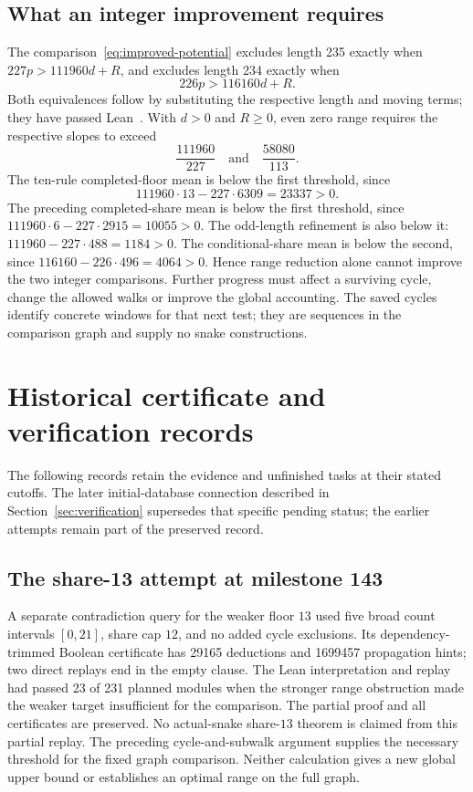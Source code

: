 \documentclass[11pt,a4paper]{article}
\theoremstyle{definition}
\theoremstyle{remark}
\begin{document}
\subsection{What an integer improvement requires}
The comparison~\eqref{eq:improved-potential} excludes length 235 exactly when
$227p>111960d+R$, and excludes length 234 exactly when
\[
226p>116160d+R.
\]
Both equivalences follow by substituting the respective length and moving
terms; they have passed Lean~\cite{totalcountarchive}. With $d>0$ and
$R\ge0$, even zero range requires the respective slopes to exceed
\[
\frac{111960}{227}\quad\text{and}\quad\frac{58080}{113}.
\]
The ten-rule completed-floor mean is below the first threshold, since
\[
111960\cdot13-227\cdot6309=23337>0.
\]
The preceding completed-share mean is below the first threshold, since $111960\cdot6-227\cdot2915=10055>0$. The odd-length refinement is also below it: $111960-227\cdot488=1184>0$. The conditional-share mean is below the second, since
$116160-226\cdot496=4064>0$. Hence range reduction alone cannot improve
the two integer comparisons. Further progress must affect a surviving
cycle, change the allowed walks or improve the global accounting. The
saved cycles identify concrete windows for that next test; they are
sequences in the comparison graph and supply no snake constructions.

\section{Historical certificate and verification records}\label{app:historical-verification-records}
The following records retain the evidence and unfinished tasks at their
stated cutoffs. The later initial-database connection described in
Section~\ref{sec:verification} supersedes that specific pending status;
the earlier attempts remain part of the preserved record.

\subsection{The share-13 attempt at milestone 143}

A separate contradiction query for the weaker floor $13$ used five broad
count intervals $[0,21]$, share cap $12$, and no added cycle exclusions.
Its dependency-trimmed Boolean certificate has 29165 deductions and
1699457 propagation hints; two direct replays end in the empty clause.
The Lean interpretation and replay had passed 23 of 231 planned modules
when the stronger range obstruction made the weaker target insufficient
for the comparison. The partial proof and all certificates are preserved.
No actual-snake share-$13$ theorem is claimed from this partial replay.
The preceding cycle-and-subwalk argument supplies the necessary threshold
for the fixed graph comparison. Neither calculation gives a new global
upper bound or establishes an optimal range on the full graph.
\end{document}
